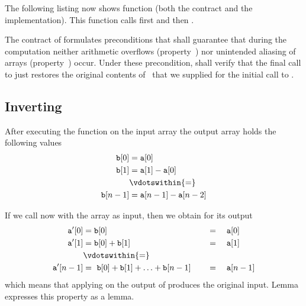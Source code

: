 


The following listing now shows \isoc function \partialsuminv
(both the contract and the implementation).
This function calls first \partialsum and then \adjacentdifference.



The contract of \partialsuminv formulates preconditions that shall guarantee
that during the computation neither arithmetic overflows (property~)
nor unintended aliasing of arrays (property~) occur.
Under these precondition, \framac shall verify
that the final call to  just restores the original contents
of~ that we supplied for the initial call to .

\clearpage

\subsection{Inverting \adjacentdifference}

After executing the function  on
the input array  the output array 
holds the following values
\begin{align*}
   \mathtt{b}[0] &= \mathtt{a}[0] \\
   \mathtt{b}[1] &= \mathtt{a}[1] - \mathtt{a}[0] \\
                 &\vdotswithin{=} \\
   \mathtt{b}[n-1] &= \mathtt{a}[n-1] - \mathtt{a}[n-2] \\
\end{align*}

If we call now \partialsum with the array 
as input, then we obtain for its output 
\begin{alignat*}{3}
   \mathtt{a'}[0] &= \mathtt{b}[0]
                  &\quad &=\quad \mathtt{a}[0] \\
   \mathtt{a'}[1] &= \mathtt{b}[0] + \mathtt{b}[1]
                  &\quad &=\quad \mathtt{a}[1] \\
                  &\vdotswithin{=} \\
   \mathtt{a'}[n-1]  &=\ \mathtt{b}[0] + \mathtt{b}[1] + \ldots + \mathtt{b}[n-1]
                     &\quad &=\quad \mathtt{a}[n-1] 
\end{alignat*}
%
which means that applying  on the output of
\adjacentdifference produces the original input.
Lemma  expresses this property as a lemma.

